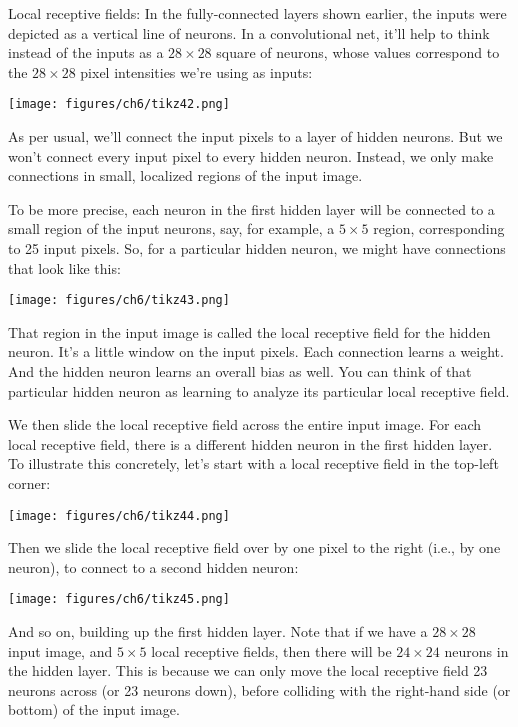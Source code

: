 \documentclass[a4paper,twoside,10pt]{book}
\begin{document}
Local receptive fields: In the fully-connected layers shown earlier, the inputs were depicted as a vertical line of neurons. In a convolutional net, it'll help to think instead of the inputs as a $28\times28$ square of neurons, whose values correspond to the $28\times28$ pixel intensities we're using as inputs:
\begin{center}
	\texttt{[image: figures/ch6/tikz42.png]}
\end{center}
As per usual, we'll connect the input pixels to a layer of hidden neurons. But we won't connect every input pixel to every hidden neuron. Instead, we only make connections in small, localized regions of the input image.

To be more precise, each neuron in the first hidden layer will be connected to a small region of the input neurons, say, for example, a $5\times5$ region, corresponding to 25 input pixels. So, for a particular hidden neuron, we might have connections that look like this:
\begin{center}
	\texttt{[image: figures/ch6/tikz43.png]}
\end{center}
That region in the input image is called the local receptive field for the hidden neuron. It's a little window on the input pixels. Each connection learns a weight. And the hidden neuron learns an overall bias as well. You can think of that particular hidden neuron as learning to analyze its particular local receptive field.

We then slide the local receptive field across the entire input image. For each local receptive field, there is a different hidden neuron in the first hidden layer. To illustrate this concretely, let's start with a local receptive field in the top-left corner:
\begin{center}
	\texttt{[image: figures/ch6/tikz44.png]}
\end{center}
Then we slide the local receptive field over by one pixel to the right (i.e., by one neuron), to connect to a second hidden neuron:
\begin{center}
	\texttt{[image: figures/ch6/tikz45.png]}
\end{center}
And so on, building up the first hidden layer. Note that if we have a $28\times28$ input image, and $5\times5$ local receptive fields, then there will be $24\times24$ neurons in the hidden layer. This is because we can only move the local receptive field 23 neurons across (or 23 neurons down), before colliding with the right-hand side (or bottom) of the input image.
\end{document}
